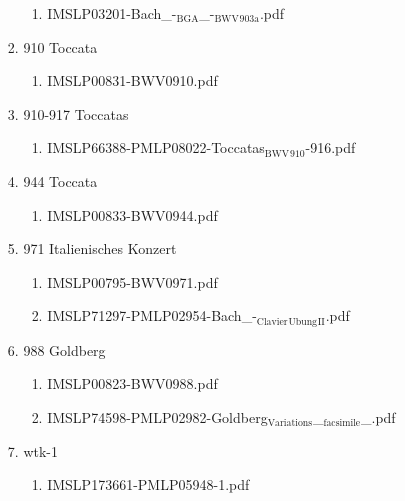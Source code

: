\documentclass[11pt]{article}
\begin{document}
\begin{enumerate}
\begin{enumerate}
\begin{enumerate}
\begin{enumerate}
\item IMSLP03201-Bach\_-$_{\text{BGA}}$\_-$_{\text{BWV}}$$_{\text{903a}}$.pdf
\label{sec-1-1-1-1-44-6-4-2-8-2}
\end{enumerate}

\item 910 Toccata
\label{sec-1-1-1-1-44-6-4-2-9}
\begin{enumerate}
\item IMSLP00831-BWV0910.pdf
\label{sec-1-1-1-1-44-6-4-2-9-1}
\end{enumerate}

\item 910-917 Toccatas
\label{sec-1-1-1-1-44-6-4-2-10}
\begin{enumerate}
\item IMSLP66388-PMLP08022-Toccatas$_{\text{BWV}}$$_{\text{910}}$-916.pdf
\label{sec-1-1-1-1-44-6-4-2-10-1}
\end{enumerate}

\item 944 Toccata
\label{sec-1-1-1-1-44-6-4-2-11}
\begin{enumerate}
\item IMSLP00833-BWV0944.pdf
\label{sec-1-1-1-1-44-6-4-2-11-1}
\end{enumerate}

\item 971 Italienisches Konzert
\label{sec-1-1-1-1-44-6-4-2-12}
\begin{enumerate}
\item IMSLP00795-BWV0971.pdf
\label{sec-1-1-1-1-44-6-4-2-12-1}

\item IMSLP71297-PMLP02954-Bach\_-$_{\text{Clavier}}$$_{\text{Ubung}}$$_{\text{II}}$.pdf
\label{sec-1-1-1-1-44-6-4-2-12-2}
\end{enumerate}

\item 988 Goldberg
\label{sec-1-1-1-1-44-6-4-2-13}
\begin{enumerate}
\item IMSLP00823-BWV0988.pdf
\label{sec-1-1-1-1-44-6-4-2-13-1}

\item IMSLP74598-PMLP02982-Goldberg$_{\text{Variations}}$\_$_{\text{facsimile}}$\_.pdf
\label{sec-1-1-1-1-44-6-4-2-13-2}
\end{enumerate}

\item wtk-1
\label{sec-1-1-1-1-44-6-4-2-14}
\begin{enumerate}
\item IMSLP173661-PMLP05948-1.pdf
\label{sec-1-1-1-1-44-6-4-2-14-1}
\end{enumerate}


\end{enumerate}
\end{enumerate}
\end{enumerate}
\end{document}
